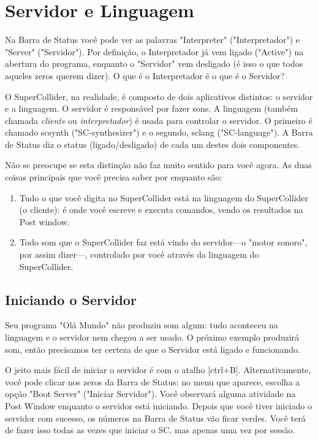 \section{Servidor e Linguagem}

Na Barra de Status você pode ver as palavras "Interpreter" ("Interpretador") e "Server" ("Servidor"). Por definição, o Interpretador já vem ligado ("Active") na abertura do programa, enquanto o "Servidor" vem desligado (é isso o que todos aqueles zeros querem dizer). O que é o Interpretador é o que é o Servidor?

O SuperCollider, na realidade, é composto de dois aplicativos distintos: o servidor e a linguagem. O servidor é responsável por fazer sons. A linguagem (também chamada \emph{cliente} ou \emph{interpretador}) é usada para controlar o servidor. O primeiro é chamado scsynth ("SC-synthesizer") e o segundo, sclang ("SC-language"). A Barra de Status diz o status (ligado/desligado) de cada um destes dois componentes.

Não se preocupe se esta distinção não faz muito sentido para você agora. As duas coisas principais que você precisa saber por enquanto são:

\begin{enumerate}
\item Tudo o que você digita no SuperCollider está na linguagem do SuperCollider (o cliente): é onde você escreve e executa comandos, vendo os resultados na Post window.
\item Todo som que o SuperCollider faz está vindo do servidor---o "motor sonoro", por assim dizer---, controlado por você através da linguagem do SuperCollider.
\end{enumerate}

\subsection{Iniciando o Servidor}
Seu programa "Olá Mundo" não produziu som algum: tudo aconteceu na linguagem e o servidor nem chegou a ser usado. O próximo exemplo produzirá som, então precisamos ter certeza de que o Servidor está ligado e funcionando.

O jeito mais fácil de iniciar o servidor é com o atalho [ctrl+B]. Alternativamente, você pode clicar nos zeros da Barra de Status: no menu que aparece, escolha a opção "Boot Server" ("Iniciar Servidor"). Você observará alguma atividade na Post Window enquanto o servidor está iniciando. Depois que você tiver iniciado o servidor com sucesso, os números na Barra de Status vão ficar verdes. Você terá de fazer isso todas as vezes que iniciar o SC, mas apenas uma vez por sessão.


